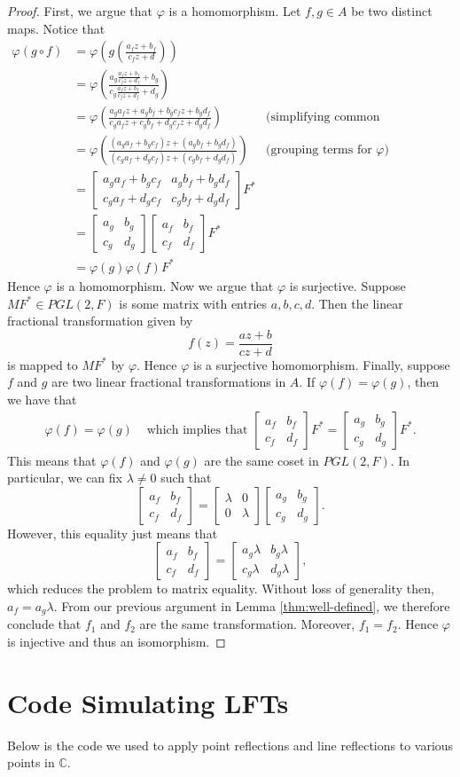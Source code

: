 \documentclass[12pt]{article}
\newcommand{\C}{\mathbb{C}}
\newcommand{\lftmat}[4]{\begin{bmatrix} {#1} & {#2} \\ {#3} & {#4} \end{bmatrix}}
\theoremstyle{plain}
\theoremstyle{definition}
\newcommand{\todo}[1]{\color{magenta} \text{{#1}} \color{black}}
\begin{document}
\begin{appendices}
\begin{proof}
	First, we argue that $\varphi$ is a homomorphism. Let $f,g\in A$ be two distinct maps. Notice that
	\begin{align*}
		\varphi(g\circ f) & = \varphi\left(g\left(\frac{a_fz + b_f}{c_fz + d}\right)\right)\\
		& = \varphi\left(\frac{a_g\frac{a_fz + b_f}{c_fz + d_f} + b_g}{c_g\frac{a_fz + b_f}{c_fz + d_f} + d_g}\right)\\
		& = \varphi\left(\frac{a_ga_fz + a_gb_f + b_gc_fz + b_gd_f}{c_ga_fz + c_gb_f + d_gc_fz + d_gd_f}\right) & \text{(simplifying common denominators)}\\
		& = \varphi\left(\frac{(a_ga_f + b_gc_f)z + (a_gb_f + b_gd_f)}{(c_ga_f + d_gc_f)z + (c_gb_f + d_gd_f)}\right) & \text{(grouping terms for $\varphi$)}\\
		& = \lftmat{a_ga_f + b_gc_f}{a_gb_f + b_gd_f}{c_ga_f + d_gc_f}{c_gb_f + d_gd_f} F^*\\
		& = \lftmat{a_g}{b_g}{c_g}{d_g}\lftmat{a_f}{b_f}{c_f}{d_f}F^*\\
		& = \varphi(g)\varphi(f)F^*
	\end{align*}
	Hence $\varphi$ is a homomorphism. Now we argue that $\varphi$ is surjective. Suppose $M F^*\in PGL(2,F)$ is some matrix with entries $a,b,c,d$. Then the linear fractional transformation given by 
	\[
		f(z) = \frac{az + b}{cz + d}
	\]
	is mapped to $M F^*$ by $\varphi$. Hence $\varphi$ is a surjective homomorphism. Finally, suppose $f$ and $g$ are two linear fractional transformations in $A$. If $\varphi(f) = \varphi(g)$, then we have that
	\begin{align*}
		\varphi(f) = \varphi(g) & \text{ which implies that } \lftmat{a_f}{b_f}{c_f}{d_f} F^* = \lftmat{a_g}{b_g}{c_g}{d_g} F^*.
	\end{align*}
	This means that $\varphi(f)$ and $\varphi(g)$ are the same coset in $PGL(2,F)$. In particular, we can fix $\lambda\neq 0$ such that
	\[
		\lftmat{a_f}{b_f}{c_f}{d_f} = \lftmat{\lambda}{0}{0}{\lambda}\lftmat{a_g}{b_g}{c_g}{d_g}.
	\]
	However, this equality just means that
	\[
		\lftmat{a_f}{b_f}{c_f}{d_f} = \lftmat{a_g\lambda}{b_g\lambda}{c_g\lambda}{d_g\lambda},
	\]
	which reduces the problem to matrix equality. Without loss of generality then, $a_f = a_g\lambda$. From our previous argument in Lemma \ref{thm:well-defined}, we therefore conclude that $f_1$ and $f_2$ are the same transformation. Moreover, $f_1 = f_2$. Hence $\varphi$ is injective and thus an isomorphism. 
\end{proof}		

\newpage
\section{Code Simulating LFTs} \label{appendixD}

Below is the code we used to apply point reflections and line reflections to various points in $\C$. 



\end{appendices}



\newpage



\nocite{guggen_book}

\noindent\todo{[AB][LG] cite the rest of our sources}
\end{document}
